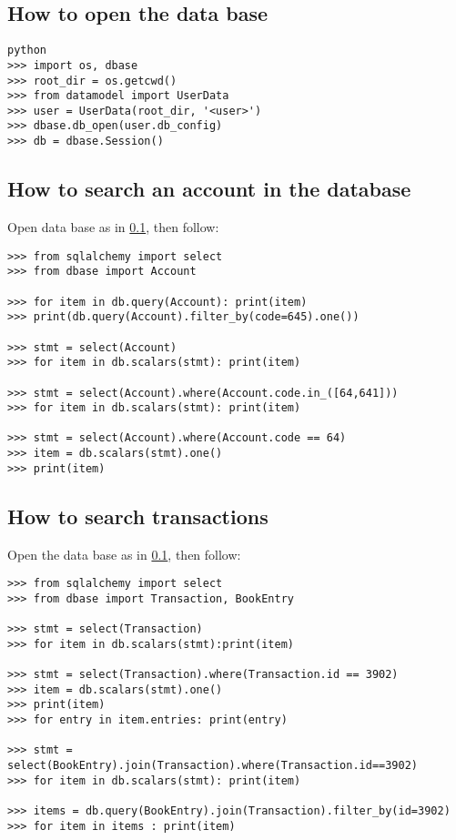 \documentclass[12pt, a4paper]{article}
\begin{document}
\subsection{How to open the data base} \label{DB_open}
\begin{verbatim}
python
>>> import os, dbase
>>> root_dir = os.getcwd()
>>> from datamodel import UserData
>>> user = UserData(root_dir, '<user>')
>>> dbase.db_open(user.db_config)
>>> db = dbase.Session()
\end{verbatim}

\subsection{How to search an account  in the database} \label{DB_search_records}
Open data base as in \ref{DB_open}, then follow:
\begin{verbatim}
>>> from sqlalchemy import select
>>> from dbase import Account

>>> for item in db.query(Account): print(item)
>>> print(db.query(Account).filter_by(code=645).one())

>>> stmt = select(Account)
>>> for item in db.scalars(stmt): print(item)

>>> stmt = select(Account).where(Account.code.in_([64,641]))
>>> for item in db.scalars(stmt): print(item)

>>> stmt = select(Account).where(Account.code == 64)
>>> item = db.scalars(stmt).one()
>>> print(item)
\end{verbatim}

\subsection{How to search transactions}
Open the data base as in \ref{DB_open}, then follow:
\begin{verbatim}
>>> from sqlalchemy import select
>>> from dbase import Transaction, BookEntry

>>> stmt = select(Transaction)
>>> for item in db.scalars(stmt):print(item)

>>> stmt = select(Transaction).where(Transaction.id == 3902)
>>> item = db.scalars(stmt).one()
>>> print(item)
>>> for entry in item.entries: print(entry)

>>> stmt = select(BookEntry).join(Transaction).where(Transaction.id==3902)
>>> for item in db.scalars(stmt): print(item)

>>> items = db.query(BookEntry).join(Transaction).filter_by(id=3902)
>>> for item in items : print(item)

\end{verbatim}
\end{document}
